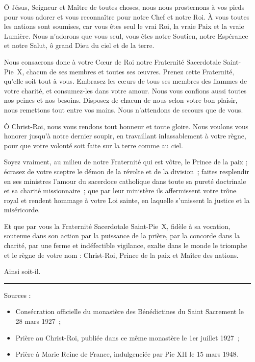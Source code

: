 \documentclass[%
a5paper%
,11pt%
,DIV=15%
,titlepage=on%
,headings=optiontoheadandtoc%
,headings=small%
,parskip=false%
,titlepage%
,openany%
]{scrbook}
\begin{document}
\begin{multicols}{2}
Ô Jésus, Seigneur et Maître de toutes choses, nous nous prosternons à vos pieds pour vous adorer et vous reconnaître pour notre Chef et notre Roi. À vous toutes les nations sont soumises, car vous êtes seul le vrai Roi, la vraie Paix et la vraie Lumière. Nous n'adorons que vous seul, vous êtes notre Soutien, notre Espérance et notre Salut, ô grand Dieu du ciel et de la terre.

Nous consacrons donc à votre Cœur de Roi notre Fraternité Sacerdotale Saint-Pie X, chacun de ses membres et toutes ses œuvres. Prenez cette Fraternité, qu'elle soit tout à vous. Embrasez les cœurs de tous ses membres des flammes de votre charité, et consumez-les dans votre amour. Nous vous confions aussi toutes nos peines et nos besoins. Disposez de chacun de nous selon votre bon plaisir, nous remettons tout entre vos mains. Nous n'attendons de secours que de vous. 

Ô Christ-Roi, nous vous rendons tout honneur et toute gloire. Nous voulons vous honorer jusqu'à notre dernier soupir, en travaillant inlassablement à votre règne, pour que votre volonté soit faite sur la terre comme au ciel.

Soyez vraiment, au milieu de notre Fraternité qui est vôtre, le Prince de la paix ; écrasez de votre sceptre le démon de la révolte et de la division ; faites resplendir en ses ministres l’amour du sacerdoce catholique dans toute sa pureté doctrinale et sa charité missionnaire ; que par leur ministère ils affermissent votre trône royal et rendent hommage à votre Loi sainte, en laquelle s'unissent la justice et la miséricorde.

Et que par vous la Fraternité Sacerdotale Saint-Pie X, fidèle à sa vocation, soutenue dans son action par la puissance de la prière, par la concorde dans la charité, par une ferme et indéfectible vigilance, exalte dans le monde le triomphe et le règne de votre nom : Christ-Roi, Prince de la paix et Maître des nations.

Ainsi soit-il.

\noindent\rule{.5\linewidth}{1sp}

{\footnotesize
\noindent Sources :
\begin{itemize}
\item Consécration officielle du monastère des Bénédictines du Saint Sacrement le 28 mars 1927 ;
\item Prière au Christ-Roi, publiée dans ce même monastère le 1er juillet 1927 ;
\item Prière à Marie Reine de France, indulgenciée par Pie XII le 15 mars 1948.
\end{itemize}
}
\end{multicols}
\end{document}
